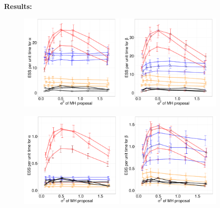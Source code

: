 \noindent \textbf{Results:}
  \begin{figure}%
  \centering
  \begin{minipage}[!hp]{0.8\linewidth}
  \centering
    \includegraphics [width=0.45\textwidth, angle=0]{figures_new_apr12/exp_alpha_dim3_18apr12.pdf}
    \includegraphics [width=0.45\textwidth, angle=0]{figures_new_apr12/exp_beta_dim3_18apr12.pdf}
  \end{minipage}
  \begin{minipage}[!hp]{0.8\linewidth}
  \centering
    \includegraphics [width=0.45\textwidth, angle=0]{figures_new_apr12/exp_alpha_dim10_18apr12.pdf}
    \vspace{-0 in}
    \includegraphics [width=0.45\textwidth, angle=0]{figures_new_apr12/exp_beta_dim10_18apr12.pdf}

\end{minipage}
\end{figure}
